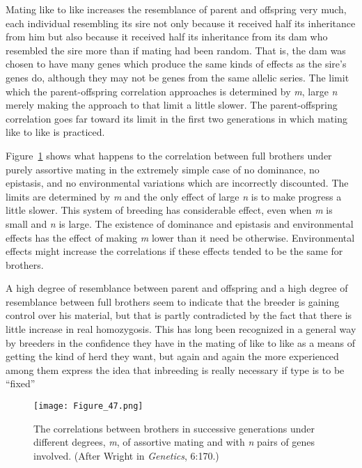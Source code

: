 Mating like to like increases the resemblance of parent and offspring
very much, each individual resembling its sire not only because it
received half its inheritance from him but also because it received half
its inheritance from its dam who resembled the sire more than if mating
had been random. That is, the dam was chosen to have many genes
which produce the same kinds of effects as the sire's genes do, although
they may not be genes from the same allelic series. The limit which the
parent-offspring correlation approaches is determined by \textit{m}, large
\textit{n} merely making the approach to that limit a little slower. The
parent-offspring correlation goes far toward its limit in the first two
generations in which mating like to like is practiced.

Figure~\ref{fig:Lush_Figure_47} shows what happens to the correlation
between full brothers under purely assortive mating in the extremely
simple case of no dominance, no epistasis, and no environmental
variations which are incorrectly discounted. The limits are determined
by \textit{m} and the only effect of large \textit{n} is to make progress
a little slower. This system of breeding has considerable effect, even
when \textit{m} is small and \textit{n} is large. The existence of
dominance and epistasis and environmental effects has the effect of making
\textit{m} lower than it need be otherwise. Environmental effects might
increase the correlations if these effects tended to be the same for brothers.

A high degree of resemblance between parent and offspring and a
high degree of resemblance between full brothers seem to indicate that
the breeder is gaining control over his material, but that is partly contradicted
by the fact that there is little increase in real homozygosis.
This has long been recognized in a general way by breeders in the confidence
they have in the mating of like to like as a means of getting the
kind of herd they want, but again and again the more experienced
among them express the idea that inbreeding is really necessary if type
is to be ``fixed''

\begin{figure}
	\centering
    \texttt{[image: Figure\_47.png]}
    \caption{The correlations between brothers in successive generations
    		 under different degrees, \textit{m}, of assortive mating and
    		 with \textit{n} pairs of genes involved. (After Wright in
    		 \textit{Genetics}, 6:170.)}
    \label{fig:Lush_Figure_47}
\end{figure}

